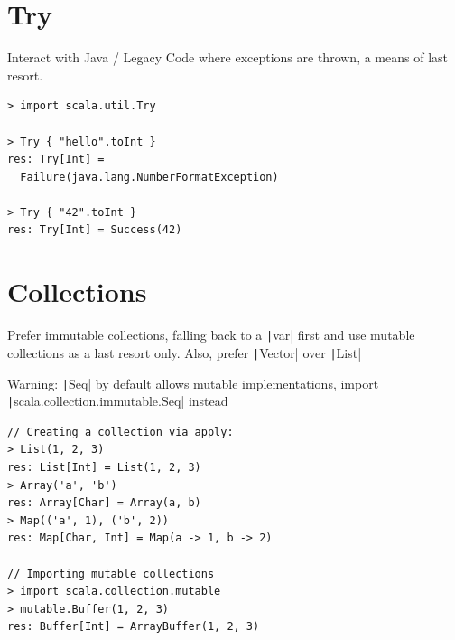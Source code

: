 \documentclass[10pt,landscape,a4paper]{article}
\begin{document}
\begin{multicols*}{4}
  \section{Try}
  \begin{mdframed}
    \footnotesize
    Interact with Java / Legacy Code where exceptions are thrown, a
    means of last resort.
  \end{mdframed}
  \begin{center}
  \end{center}
\begin{verbatim}
> import scala.util.Try

> Try { "hello".toInt }
res: Try[Int] =
  Failure(java.lang.NumberFormatException)

> Try { "42".toInt }
res: Try[Int] = Success(42)
\end{verbatim}

  \section{Collections}

  \begin{mdframed}
    \footnotesize

    \par Prefer immutable collections, falling back to a
    \texttt|var| first and use mutable collections as a
    last resort only.  Also, prefer \texttt|Vector| over
    \texttt|List|\\

    \par \textcolor{myred!120}{Warning:}
    \texttt|Seq| by default allows mutable
    implementations, import
    \texttt|scala.collection.immutable.Seq| instead
  \end{mdframed}

\begin{verbatim}
// Creating a collection via apply:
> List(1, 2, 3)
res: List[Int] = List(1, 2, 3)
> Array('a', 'b')
res: Array[Char] = Array(a, b)
> Map(('a', 1), ('b', 2))
res: Map[Char, Int] = Map(a -> 1, b -> 2)

// Importing mutable collections
> import scala.collection.mutable
> mutable.Buffer(1, 2, 3)
res: Buffer[Int] = ArrayBuffer(1, 2, 3)
\end{verbatim}


\end{multicols*}
\end{document}
